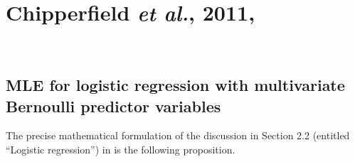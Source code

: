 

\section{Chipperfield \textit{et al.}, 2011, \cite{Chipperfield2011}}
\setcounter{theorem}{0}
\setcounter{equation}{0}

\renewcommand{\theenumi}{\roman{enumi}}
\renewcommand{\labelenumi}{\textnormal{(\theenumi)}$\;\;$}

           ~~~~~~~~~~~~~~~~~~~~ %

\subsection{MLE for logistic regression with multivariate Bernoulli predictor variables}

The precise mathematical formulation of the discussion in
Section 2.2 (entitled ``Logistic regression'') in \cite{Chipperfield2011}
is the following proposition.

